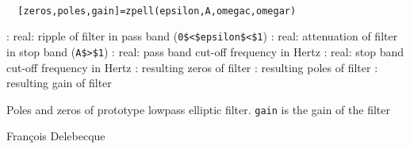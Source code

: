 
\begin{mandesc} 
   \\ %
\end{mandesc}
\begin{calling_sequence}
\begin{verbatim}
  [zeros,poles,gain]=zpell(epsilon,A,omegac,omegar)  
\end{verbatim}
\end{calling_sequence}
\begin{parameters}
  \begin{varlist}
    : real: ripple of filter in pass band (\verb!0$<$epsilon$<$1!)
    : real: attenuation of filter in stop band (\verb!A$>$1!)
    : real: pass band cut-off frequency in Hertz
    : real: stop band cut-off frequency in Hertz
    : resulting zeros of filter
    : resulting poles of filter
    : resulting gain of filter
  \end{varlist}
\end{parameters}
\begin{mandescription}
  Poles and zeros of prototype lowpass elliptic filter.
  \verb!gain! is the gain of the filter
\end{mandescription}
\begin{manseealso}
     
\end{manseealso}
\begin{authors}
  Fran\c{c}ois  Delebecque   
\end{authors}
